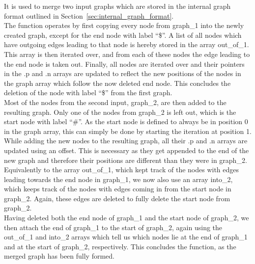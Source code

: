 \documentclass[a4paper,12pt,twoside,BCOR=10mm]{scrbook}
\begin{document}
\begin{algorithm}
\begin{algorithmic}[1]
\State \phantom{nl}

\EndFor

\State \phantom{nl}

		\State {\textbf{append} into\_2$[ j ]$ \textbf{to} graph[out\_of\_1$[ i ]$.n}
		\State {\textbf{append} out\_of\_1$[ i ]$ \textbf{to} graph[into\_2$[ j ]$.p}
	\EndFor
\EndFor

\end{algorithmic}
\end{algorithm}
It is used to merge two input graphs which are stored in the internal graph format
outlined in Section~\ref{sec:internal_graph_format}. \\
The function operates by first copying every node from graph\_1 into the newly created graph,
except for the end node with label “\$”. A list of all nodes which have outgoing edges leading to that node
is hereby stored in the array out\_of\_1.
This array is then iterated over, and from each of these nodes the edge leading to the end node is taken out.
Finally, all nodes are iterated over and their pointers in the .p and .n arrays are updated to reflect
the new positions of the nodes in the graph array which follow the now deleted end node.
This concludes the deletion of the node with label “\$” from the first graph. \\
Most of the nodes from the second input, graph\_2, are then added to the resulting graph.
Only one of the nodes from graph\_2 is left out, which is the start node with label “\#”.
As the start node is defined to always be in position 0 in the graph array,
this can simply be done by starting the iteration at position 1.
While adding the new nodes to the resulting graph,
all their .p and .n arrays are updated using an offset.
This is necessary as they get appended to the end of the new graph
and therefore their positions are different than they were in graph\_2.
Equivalently to the array out\_of\_1, which kept track of the nodes with edges leading towards the end node in graph\_1,
we now also use an array into\_2, which keeps track of the nodes with edges coming in from the start node in graph\_2.
Again, these edges are deleted to fully delete the start node from graph\_2. \\
Having deleted both the end node of graph\_1 and the start node of graph\_2,
we then attach the end of graph\_1 to the start of graph\_2, again using the out\_of\_1 and into\_2 arrays
which tell us which nodes lie at the end of graph\_1 and at the start of graph\_2, respectively.
This concludes the function, as the merged graph has been fully formed.
\end{document}
